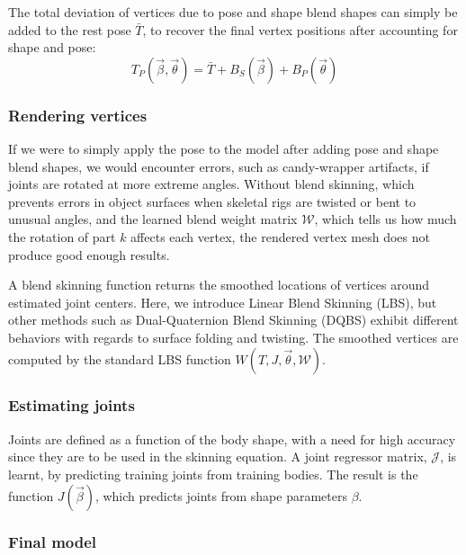 \documentclass[9pt,twocolumn]{article}
\begin{document}
			\par{The total deviation of vertices due to pose and shape blend shapes can simply be added to the rest pose $\bar{T}$, to
			recover the final vertex positions after accounting for shape and pose:
			\begin{equation}
				T_{P}(\vec{\beta},\vec{\theta}) = \bar{T} + B_{S}(\vec{\beta}) + B_{P}(\vec{\theta})
			\end{equation}
			}

		\subsubsection{Rendering vertices}

			\par{If we were to simply apply the pose to the model after adding pose and shape blend shapes, we
			would encounter errors, such as candy-wrapper artifacts, if joints are rotated at more extreme angles.
			Without blend skinning, which prevents errors in object surfaces when skeletal rigs are twisted or
			bent to unusual angles, and the learned blend weight matrix $\mathcal{W}$, which tells us how much the
			rotation of part $k$ affects each vertex, the rendered vertex mesh does not produce good enough results.}\\

			\par{A blend skinning function returns the smoothed locations of vertices around estimated joint
			centers. Here, we introduce Linear Blend Skinning (LBS), but other methods such as Dual-Quaternion
			Blend Skinning (DQBS) exhibit different behaviors with regards to surface folding and twisting.
			The smoothed vertices are computed by the standard LBS function $W(T,J,\vec{\theta},\mathcal{W})$.}


		\subsubsection{Estimating joints}

			\par{Joints are defined as a function of the body shape, with a need for high accuracy since they are to be used in the
			skinning equation. A joint regressor matrix, $\mathcal{J}$, is learnt, by predicting training joints from training
			bodies.	The result is the function $J(\vec{\beta})$, which predicts joints from shape parameters $\beta$.}

		\subsubsection{Final model}
			
\end{document}

